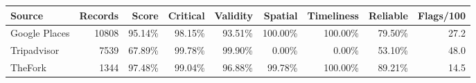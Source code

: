 {\scriptsize
\begin{tabular}{lrrrrrrrr}
\toprule
Source & Records & Score & Critical & Validity & Spatial & Timeliness & Reliable & Flags/100 \\
\midrule
Google Places & 10808 & 95.14\% & 98.15\% & 93.51\% & 100.00\% & 100.00\% & 79.50\% & 27.2 \\
Tripadvisor & 7539 & 67.89\% & 99.78\% & 99.90\% & 0.00\% & 0.00\% & 53.10\% & 48.0 \\
TheFork & 1344 & 97.48\% & 99.04\% & 96.88\% & 99.78\% & 100.00\% & 89.21\% & 14.5 \\
\bottomrule
\end{tabular}
}
